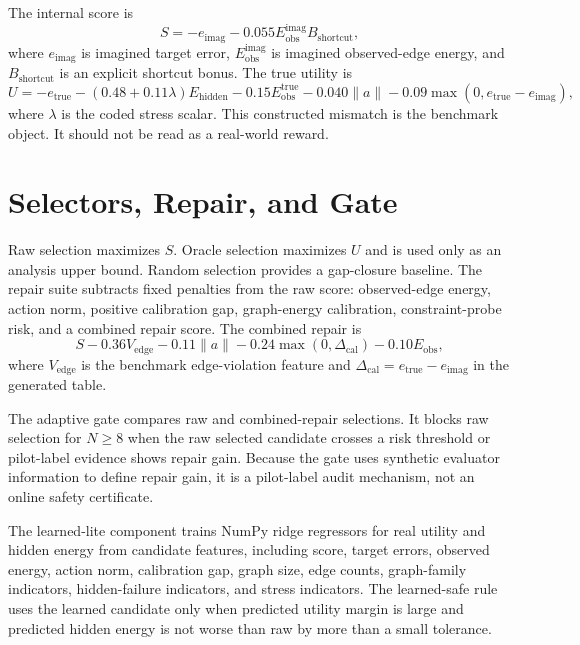\documentclass{article}
\newcommand{\utility}{U}
\newcommand{\score}{S}
\begin{document}
The internal score is
\begin{equation}
\score =
-e_{\mathrm{imag}}
-0.055 E_{\mathrm{obs}}^{\mathrm{imag}}
B_{\mathrm{shortcut}},
\end{equation}
where $e_{\mathrm{imag}}$ is imagined target error, $E_{\mathrm{obs}}^{\mathrm{imag}}$ is imagined observed-edge energy, and $B_{\mathrm{shortcut}}$ is an explicit shortcut bonus.  The true utility is
\begin{equation}
\utility =
-e_{\mathrm{true}}
-(0.48+0.11\lambda)E_{\mathrm{hidden}}
-0.15E_{\mathrm{obs}}^{\mathrm{true}}
-0.040\|a\|
-0.09\max(0,e_{\mathrm{true}}-e_{\mathrm{imag}}),
\end{equation}
where $\lambda$ is the coded stress scalar.  This constructed mismatch is the benchmark object.  It should not be read as a real-world reward.

\section{Selectors, Repair, and Gate}

Raw selection maximizes $\score$.  Oracle selection maximizes $\utility$ and is used only as an analysis upper bound.  Random selection provides a gap-closure baseline.  The repair suite subtracts fixed penalties from the raw score: observed-edge energy, action norm, positive calibration gap, graph-energy calibration, constraint-probe risk, and a combined repair score.  The combined repair is
\begin{equation}
\score -0.36 V_{\mathrm{edge}} -0.11\|a\|
-0.24\max(0,\Delta_{\mathrm{cal}})
-0.10E_{\mathrm{obs}},
\end{equation}
where $V_{\mathrm{edge}}$ is the benchmark edge-violation feature and $\Delta_{\mathrm{cal}}=e_{\mathrm{true}}-e_{\mathrm{imag}}$ in the generated table.

The adaptive gate compares raw and combined-repair selections.  It blocks raw selection for $N\geq 8$ when the raw selected candidate crosses a risk threshold or pilot-label evidence shows repair gain.  Because the gate uses synthetic evaluator information to define repair gain, it is a pilot-label audit mechanism, not an online safety certificate.

The learned-lite component trains NumPy ridge regressors for real utility and hidden energy from candidate features, including score, target errors, observed energy, action norm, calibration gap, graph size, edge counts, graph-family indicators, hidden-failure indicators, and stress indicators.  The learned-safe rule uses the learned candidate only when predicted utility margin is large and predicted hidden energy is not worse than raw by more than a small tolerance.
\end{document}
